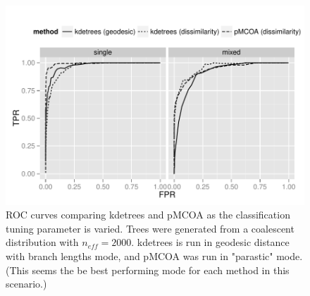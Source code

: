 \documentclass{article}
\begin{document}
\begin{figure}
  \centering
  \includegraphics{img/rocmix.pdf}
  \caption{ROC curves comparing kdetrees and pMCOA as the
    classification tuning parameter is varied. Trees were generated
    from a coalescent distribution with $n_{eff}=2000$. kdetrees is
    run in geodesic distance with branch lengths mode, and pMCOA was
    run in "parastic" mode. (This seems the be best performing mode
    for each method in this scenario.)}
  \label{fig:roc}
\end{figure}
\end{document}
